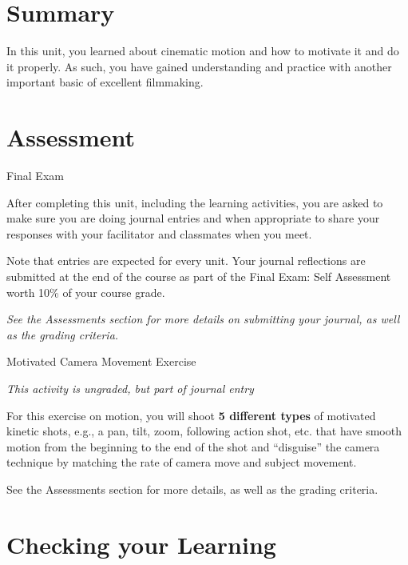 \documentclass[
]{book}
\begin{document}
\hypertarget{summary-3}{%
\section*{Summary}\label{summary-3}}

In this unit, you learned about cinematic motion and how to motivate it and do it properly. As such, you have gained understanding and practice with another important basic of excellent filmmaking.

\hypertarget{assessment-5}{%
\section*{Assessment}\label{assessment-5}}

\begin{assessment}
{Final Exam}

After completing this unit, including the learning activities, you are asked to make sure you are doing journal entries and when appropriate to share your responses with your facilitator and classmates when you meet.

Note that entries are expected for every unit. Your journal reflections are submitted at the end of the course as part of the Final Exam: Self Assessment worth 10\% of your course grade.

\emph{See the Assessments section for more details on submitting your journal, as well as the grading criteria.}

{Motivated Camera Movement Exercise}

\emph{This activity is ungraded, but part of journal entry}

For this exercise on motion, you will shoot \textbf{5 different types} of motivated kinetic shots, e.g., a pan, tilt, zoom, following action shot, etc. that have smooth motion from the beginning to the end of the shot and ``disguise'' the camera technique by matching the rate of camera move and subject movement.

See the Assessments section for more details, as well as the grading criteria.
\end{assessment}

\hypertarget{checking-your-learning-3}{%
\section*{Checking your Learning}\label{checking-your-learning-3}}
\end{document}
